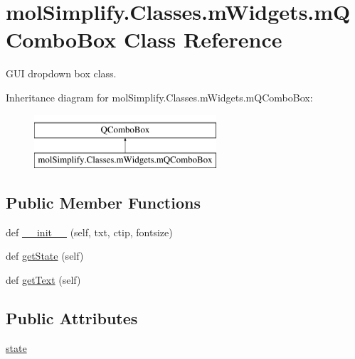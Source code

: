 \hypertarget{classmolSimplify_1_1Classes_1_1mWidgets_1_1mQComboBox}{}\section{mol\+Simplify.\+Classes.\+m\+Widgets.\+m\+Q\+Combo\+Box Class Reference}
\label{classmolSimplify_1_1Classes_1_1mWidgets_1_1mQComboBox}


G\+UI dropdown box class.  


Inheritance diagram for mol\+Simplify.\+Classes.\+m\+Widgets.\+m\+Q\+Combo\+Box\+:\begin{figure}[H]
\begin{center}
\leavevmode
\includegraphics[height=2.000000cm]{classmolSimplify_1_1Classes_1_1mWidgets_1_1mQComboBox}
\end{center}
\end{figure}
\subsection*{Public Member Functions}
\begin{DoxyCompactItemize}
\item 
def \hyperlink{classmolSimplify_1_1Classes_1_1mWidgets_1_1mQComboBox_afaf4adf57e88ad34e4bf69665618df03}{\+\_\+\+\_\+init\+\_\+\+\_\+} (self, txt, ctip, fontsize)
\item 
def \hyperlink{classmolSimplify_1_1Classes_1_1mWidgets_1_1mQComboBox_a72f40806a96a8090899cdfdb7f52cff7}{get\+State} (self)
\item 
def \hyperlink{classmolSimplify_1_1Classes_1_1mWidgets_1_1mQComboBox_ab9644845237e3c327c353e4d27058755}{get\+Text} (self)
\end{DoxyCompactItemize}
\subsection*{Public Attributes}
\begin{DoxyCompactItemize}
\item 
\hyperlink{classmolSimplify_1_1Classes_1_1mWidgets_1_1mQComboBox_a58df656e7910be7e97773966dc068e8e}{state}
\end{DoxyCompactItemize}


